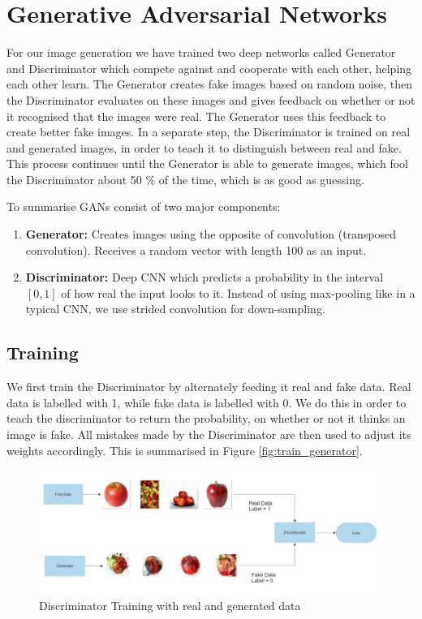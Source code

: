 \documentclass[13pt]{article}
\begin{document}
\section{Generative Adversarial Networks} \label{sec:gan}

For our image generation we have trained two deep networks called Generator and Discriminator which compete against and cooperate with each other, helping each other learn.
The Generator creates fake images based on random noise, then the Discriminator evaluates on these images and gives feedback on whether or not it recognised that the images were real.
The Generator uses this feedback to create better fake images.
In a separate step, the Discriminator is trained on real and generated images, in order to teach it to distinguish between real and fake. 
This process continues until the Generator is able to generate images, which fool the Discriminator about 50 \% of the time, which is as good as guessing.

To summarise GANs consist of two major components:
\begin{enumerate}
    \item \textbf{Generator:} Creates images using the opposite of convolution (transposed convolution). Receives a random vector with length 100 as an input.
    \item \textbf{Discriminator:} Deep CNN which predicts a probability in the interval $[0,1]$ of how real the input looks to it. Instead of using max-pooling like in a typical CNN, we use strided convolution for down-sampling.
\end{enumerate}

\subsection{Training}

We first train the Discriminator by alternately feeding it real and fake data. Real data is labelled with 1, while fake data is labelled with 0. We do this in order to teach the discriminator to return the probability, on whether or not it thinks an image is fake. All mistakes made by the Discriminator are then used to adjust its weights accordingly. This is summarised in Figure \ref{fig:train_generator}.

\begin{figure}[h!]
\centering
\centerline{\includegraphics[width=\textwidth]{models/training_discriminator.png}}
\caption{Discriminator Training with real and generated data}
\label{fig:train_discriminator}
\end{figure}
\end{document}
